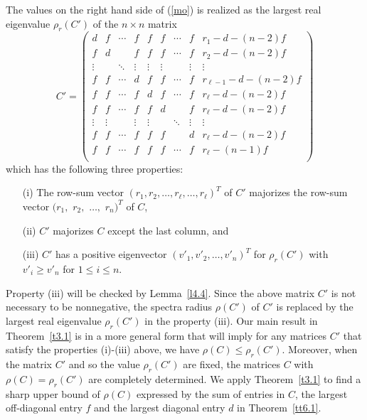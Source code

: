 \documentclass[final,3p, times, 12pt]{elsarticle}
\theoremstyle{plain}
\theoremstyle{definition}
\theoremstyle{remark}
\numberwithin{equation}{section}
\begin{document}
The values on the right hand side of (\ref{mo}) is realized as the largest real eigenvalue $\rho_r(C')$ of the $n\times n$ matrix
\begin{equation}\label{ne1.0}C'=\left(\begin{array}{cccc|ccccc}
d     &f      &\cdots &f      &f      & f        &\cdots &f       &r_1-d-(n-2)f\\
f     &d      &       &f      &f      & f        &\cdots &f       &r_2-d-(n-2)f\\
\vdots&       &\ddots &\vdots &\vdots &\vdots    &       &\vdots  &\vdots      \\
f     &f      &\cdots &d      & f     & f        &\cdots &f       &r_{\ell-1}-d-(n-2)f\\ \hline
f     &f      &\cdots &f      & d     & f        &\cdots &f       &r_{\ell}-d-(n-2)f\\
f     &f      &\cdots &f      & f     & d        &       &f       &r_{\ell}-d-(n-2)f\\
\vdots&\vdots &       &\vdots &\vdots &          &\ddots &\vdots  &\vdots\\
f     &f      &\cdots &f      & f     & f        &       &d       &r_{\ell}-d-(n-2)f\\
f     &f      &\cdots &f      & f     & f        &\cdots &f       &r_{\ell}-(n-1)f\\
\end{array}\right)\end{equation}
which has the following three properties:
\begin{enumerate}
\item[(i)]  The row-sum vector $(r_1, r_2, \ldots, r_\ell, \ldots,  r_\ell)^T$ of $C'$ majorizes the row-sum vector  $(r_1,$ $r_2,$ $\ldots,$ $r_n)^T$ of $C$,
\item[(ii)] $C'$ majorizes $C$ except the last column, and
\item[(iii)] $C'$ has a positive eigenvector $(v'_1, v'_2, \ldots, v'_n)^T$ for $\rho_r(C')$ with $v'_i\geq v'_n$ for $1\leq i\leq n.$
\end{enumerate}
Property (iii) will be checked by Lemma~\ref{l4.4}. Since the above matrix $C'$ is not necessary to be nonnegative, the spectra radius $\rho(C')$ of $C'$ is replaced by the largest real eigenvalue $\rho_r(C')$ in the property (iii).
 Our main result in Theorem~\ref{t3.1} is in a more general form that will imply for any matrices $C'$ that satisfy the properties (i)-(iii) above, we have $\rho(C)\leq \rho_r(C').$
Moreover, when the matrix $C'$ and so the value $\rho_r(C')$ are fixed, the matrices $C$ with $\rho(C)=\rho_r(C')$ are completely determined.
We apply Theorem~\ref{t3.1} to find a sharp upper bound of $\rho(C)$ expressed by the sum of entries in $C$, the largest off-diagonal entry $f$ and the largest diagonal entry $d$ in Theorem~\ref{tt6.1}.
\end{document}

